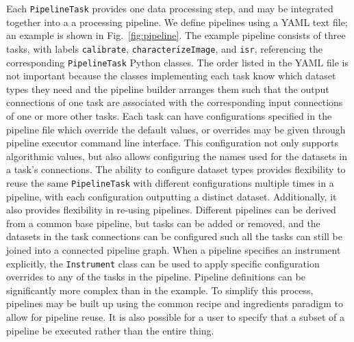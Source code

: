 \documentclass[]{spie}
\begin{document}
Each \texttt{PipelineTask} provides one data processing step, and may be integrated together into a a processing pipeline.
We define pipelines using a YAML text file; an example is shown in Fig.~\ref{fig:pipeline}.
The example pipeline consists of three tasks, with labels \texttt{calibrate}, \texttt{characterizeImage}, and \texttt{isr}, referencing the corresponding \texttt{PipelineTask} Python classes.
The order listed in the YAML file is not important because the classes implementing each task know which dataset types they need and the pipeline builder arranges them such that the output connections of one task are associated with the corresponding input connections of one or more other tasks.
Each task can have configurations specified in the pipeline file which override the default values, or overrides may be given through pipeline executor command line interface.
This configuration not only supports algorithmic values, but also allows configuring the names used for the datasets in a task's connections.
The ability to configure dataset types provides flexibility to reuse the same \texttt{PipelineTask} with different configurations multiple times in a pipeline, with each configuration outputting a distinct dataset.
Additionally, it also provides flexibility in re-using pipelines.
Different pipelines can be derived from a common base pipeline, but tasks can be added or removed, and the datasets in the task connections can be configured such all the tasks can still be joined into a connected pipeline graph.
When a pipeline specifies an instrument explicitly, the \texttt{Instrument} class can be used to apply specific configuration overrides to any of the tasks in the pipeline.
Pipeline definitions can be significantly more complex than in the example.
To simplify this process, pipelines may be built up using the common recipe and ingredients paradigm\cite{2015A&C.....9...40J,2020ASPC..522..583L} to allow for pipeline reuse.
It is also possible for a user to specify that a subset of a pipeline be executed rather than the entire thing.
\end{document}
